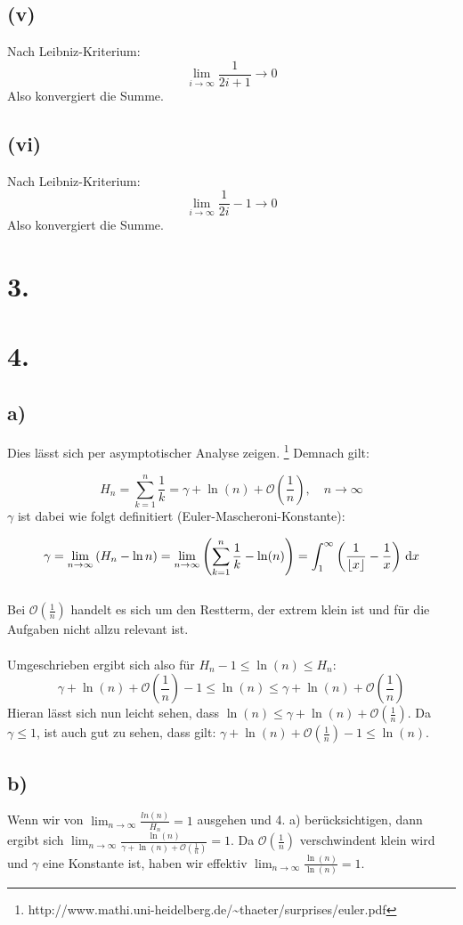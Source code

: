 \documentclass[a4paper]{scrartcl}
\begin{document}
\subsection{(v)}
Nach Leibniz-Kriterium:
\[ \lim_{i\to\infty} \frac 1 {2i+1} \rightarrow 0 \]
Also konvergiert die Summe.

\subsection{(vi)}
Nach Leibniz-Kriterium:
\[ \lim_{i\to\infty} \frac 1 {2i} - 1 \rightarrow 0 \]
Also konvergiert die Summe.

\section{3.}

\section{4.}
\subsection{a)}
Dies lässt sich per asymptotischer Analyse zeigen. \footnote{http://www.mathi.uni-heidelberg.de/\textasciitilde thaeter/surprises/euler.pdf}
Demnach gilt:

\[H_n=\sum_{k=1}^n \frac{1}{k} = \gamma + \ln (n) +\mathcal O\!\left(\frac 1{n}\right),\quad n\to\infty \]
%
\(\gamma\) ist dabei wie folgt definitiert (Euler-Mascheroni-Konstante):

\[ \gamma = \lim_{n\to\infty} \left(H_n - \ln n\right) = \lim_{n \rightarrow \infty } \left(\sum_{k=1}^n \frac{1}{k} - \ln(n) \right)=\int_1^\infty\left({1\over\lfloor x\rfloor}-{1\over x}\right)\,\mathrm dx \] \\
%
Bei \(\mathcal O\!\left(\frac 1{n}\right)\) handelt es sich um den Restterm, der extrem klein ist und für die Aufgaben nicht allzu relevant ist. \\ \\
%
Umgeschrieben ergibt sich also für \(H_n -1 \leq \ln (n) \leq H_n \):
\[ \gamma + \ln (n) +\mathcal O\!\left(\frac 1{n}\right) -1 \leq \ln (n) \leq \gamma + \ln (n) +\mathcal O\!\left(\frac 1{n}\right)\]
%
Hieran lässt sich nun leicht sehen, dass \( \ln (n) \leq \gamma + \ln (n) +\mathcal O\!\left(\frac 1{n}\right) \). Da \(\gamma \leq 1\), ist auch gut zu sehen, dass gilt: \( \gamma + \ln (n) +\mathcal O\!\left(\frac 1{n}\right) -1 \leq \ln (n) \).

\subsection{b)}
Wenn wir von \(\lim_{n\to\infty} \frac {ln(n)} {H_n} = 1 \) ausgehen und 4. a) berücksichtigen, dann ergibt sich \(\lim_{n\to\infty} \frac {\ln(n)} {\gamma + \ln (n) +\mathcal O\!\left(\frac 1{n}\right) } = 1 \). Da \(\mathcal O\!\left(\frac 1{n}\right)\) verschwindent klein wird und \(\gamma\) eine Konstante ist, haben wir effektiv \(\lim_{n\to\infty} \frac {\ln(n)} {\ln(n)} = 1\).
\end{document}
